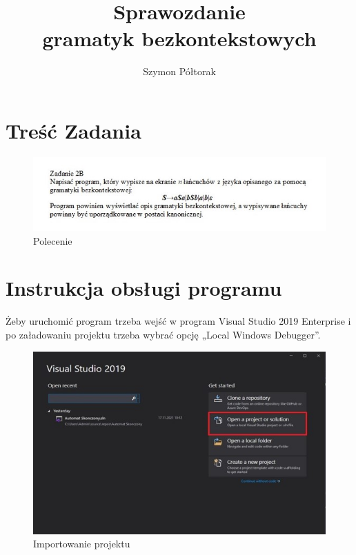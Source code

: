 \documentclass[10pt, a4paper]{report}
\title{\huge{\textbf{Sprawozdanie}}\\ gramatyk bezkontekstowych}
\author{Szymon Półtorak}
\date{}
\begin{document}
    \maketitle

    \renewcommand*\thesection{\arabic{section}} 
    
    \pagestyle{fancy}
    \fancyhf{}
    
    \tableofcontents
    \newpage

    \section{Treść Zadania}
    \begin{figure}[h]
        \begin{center}
            \includegraphics[scale=1]{photo1.jpg}
            \caption{Polecenie}
        \end{center}
    \end{figure}

    \section{Instrukcja obsługi programu}
    Żeby uruchomić program trzeba wejść w program Visual Studio 2019 Enterprise i po załadowaniu
    projektu trzeba wybrać opcję „Local Windows Debugger”.

    \begin{figure}[h]
        \begin{center}
            \includegraphics[scale=1]{photo2.jpg}
            \caption{Importowanie projektu}
        \end{center}
    \end{figure}
    \newpage
\end{document}
